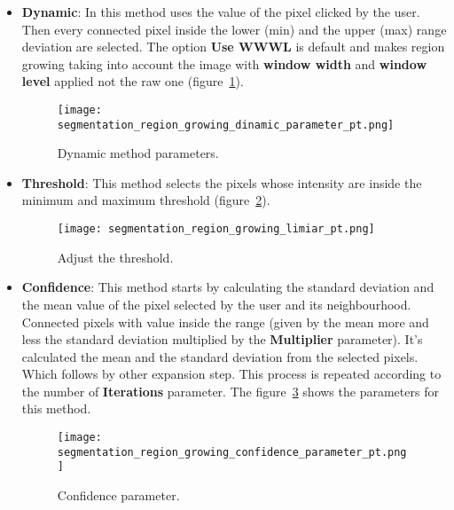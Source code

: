 \begin{itemize}
	\item \textbf{Dynamic}: In this method uses the value of the pixel clicked by the user. Then every connected pixel inside the lower (min) and the upper (max) range deviation are selected. The option \textbf{Use WWWL} is default and makes region growing taking into account the image with \textbf{window width} and \textbf{window level} applied not the raw one (figure~\ref{fig:segmentation_region_growing_dinamic_parameter}).

	\begin{figure}[!htb]
	\centering
	\texttt{[image: segmentation\_region\_growing\_dinamic\_parameter\_pt.png]}
	\caption{Dynamic method parameters.}
	\label{fig:segmentation_region_growing_dinamic_parameter}
	\end{figure}

	\item \textbf{Threshold}: This method selects the pixels whose intensity are inside the minimum and maximum threshold (figure~\ref{fig:segmentation_region_growing_limiar}).

	\begin{figure}[!htb]
	\centering
	\texttt{[image: segmentation\_region\_growing\_limiar\_pt.png]}
    \caption{Adjust the threshold.}
	\label{fig:segmentation_region_growing_limiar}
	\end{figure}

    \item \textbf{Confidence}: This method starts by calculating the standard deviation and the mean value of the pixel selected by the user and its neighbourhood. Connected pixels with value inside the range (given by the mean more and less the standard deviation multiplied by the \textbf{Multiplier} parameter). It's calculated the mean and the standard deviation from the selected pixels. Which follows by other expansion step. This process is repeated according to the number of \textbf{Iterations} parameter. The figure~\ref{fig:segmentation_region_growing_confidence_parameter} shows the parameters for this method.

	\begin{figure}[!htb]
	\centering
	\texttt{[image: segmentation\_region\_growing\_confidence\_parameter\_pt.png]}
    \caption{Confidence parameter.}
	\label{fig:segmentation_region_growing_confidence_parameter}
	\end{figure}


\end{itemize}
